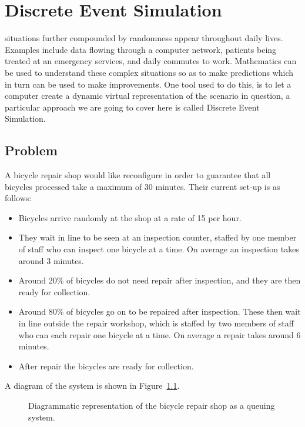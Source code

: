 \chapter[Discrete Event Simulation]{Discrete Event Simulation}\label{chp:discrete_event_simulation}

 situations further compounded by randomness appear
throughout daily lives. Examples include data flowing through a computer
network, patients being treated at an emergency services, and daily commutes to
work.
Mathematics can be used to understand these complex situations so as to
make predictions which in turn can be used to make improvements. One tool used
to do this, is to let a computer create a dynamic virtual representation of the
scenario in question, a particular approach we are going to cover here is called
Discrete Event Simulation.

\section{Problem}\label{sec:discrete_event_simulation_problem}

A bicycle repair shop would like reconfigure
in order to guarantee that all bicycles processed take a maximum of 30 minutes.
Their current set-up is as follows:

\begin{itemize}
  \item Bicycles arrive randomly at the shop at a rate of 15 per hour.
  \item They wait in line to be seen at an inspection counter, staffed by one
  member of staff who can inspect one bicycle at a time. On average an
  inspection takes around 3 minutes.
  \item Around 20\% of bicycles do not need
  repair after inspection, and they are then ready for collection.
  \item Around 80\% of bicycles go on to be
  repaired after inspection. These then wait in line outside the repair
  workshop, which is staffed by two members of staff who can each repair
  one bicycle at a time. On average
  a repair takes around 6 minutes.
  \item After repair the bicycles are ready for collection.
\end{itemize}

A diagram of the system is shown in Figure~\ref{fig:bike-shop}.

\begin{figure}
    \begin{center}
        
    \end{center}
    \caption{
        Diagrammatic representation of the bicycle repair shop as a queuing
        system.
    }
    \label{fig:bike-shop}
\end{figure}

